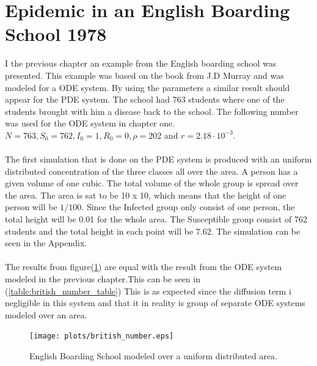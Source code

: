 \documentclass[%
twoside,                 %
final,                   %
10pt]{article}
\begin{document}
\section{Epidemic in an English Boarding School 1978}
I the previous chapter an example from the English boarding school was presented. This example was based on the book from J.D Murray and was modeled for a ODE system. By using the parameters a similar result should appear for the PDE system. The school had 763 students where one of the students brought with him a disease back to the school. The following number was used for the ODE system in chapter one. $N=763, S_0=762,I_0=1,R_0=0,\rho=202$ and $r = 2.18\cdot 10^{-3}$. 
\\
\\
The first simulation that is done on the PDE system is produced with an uniform distributed concentration of the three classes all over the area. A person has a given volume of one cubic. The total volume of the whole group is spread over the area. The area is sat to be 10 x 10, which means that the height of one person will be $1/100$. Since the Infected group only consist of one person, the total height will be 0.01 for the whole area. The Susceptible group consist of 762 students and the total height in each point will be 7.62. The simulation can be seen in the Appendix. 
\\
\\
The results from figure(\ref{fig:british_number}) are equal with the result from the ODE system modeled in the previous chapter.This can be seen in (\ref{table:british_number_table})  This is as expected since the diffusion term i negligible in this system and that it in reality is group of separate ODE systems modeled over an area.


\begin{figure}[ht]
  \centerline{\texttt{[image: plots/british\_number.eps]}}
  \caption{
  \label{fig:british_number} English Boarding School modeled over a uniform distributed area.
  }
\end{figure}


\label{table:british_number_table}
\end{document}
